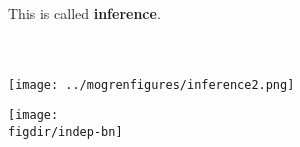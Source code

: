 \documentclass[12pt]{beamer} %
\newcommand{\figdir}{../../figures/ch06}
\begin{document}
\begin{slide}

This is called \textbf{inference}.\\
~\\
~\\


\begin{center}
\texttt{[image: ../mogrenfigures/inference2.png]}
\end{center}

\end{slide}










\begin{slide}
\begin{center}
\texttt{[image: \\figdir/indep-bn]}
\end{center}


\end{slide}
\end{document}
